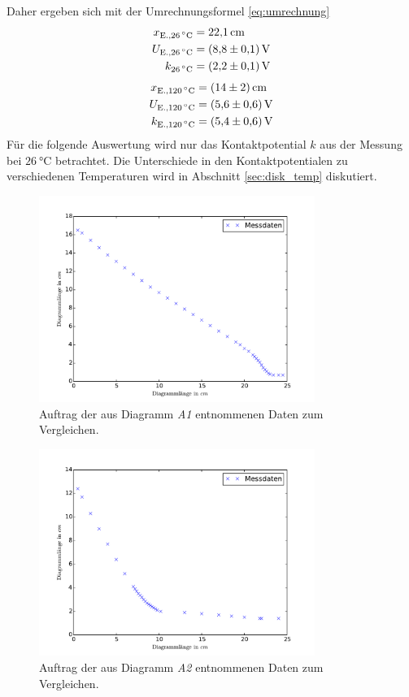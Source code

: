Daher ergeben sich mit der Umrechnungsformel \eqref{eq:umrechnung}
\begin{align}
	x_\text{E.,\SI{26}{\degreeCelsius}}&= \SI{22.1}{\centi\meter}\\
	U_\text{E.,\SI{26}{\degreeCelsius}}&= \SI{8.8(1)}{\volt}\\
	k_\text{\SI{26}{\degreeCelsius}} &= \SI{2.2(1)}{\volt}
	\label{qu:k1}
\end{align}
\begin{align}
	x_\text{E.,\SI{120}{\degreeCelsius}}&= \SI{14(2)}{\centi\meter}\\
	U_\text{E.,\SI{120}{\degreeCelsius}}&= \SI{5.6(6)}{\volt}\\
	k_\text{E.,\SI{120}{\degreeCelsius}}&= \SI{5.4(6)}{\volt}
\end{align}
Für die folgende Auswertung wird nur das Kontaktpotential $k$ aus der Messung bei $\SI{26}{\degreeCelsius}$ betrachtet.
Die Unterschiede in den Kontaktpotentialen zu verschiedenen Temperaturen wird in Abschnitt \ref{sec:disk_temp} diskutiert.
\newpage
\begin{figure}[p!]
	\centering
	\includegraphics[width=0.8\textwidth]{Bilder/Vert_kalt.pdf}
	\caption{Auftrag der aus Diagramm \emph{A1} entnommenen Daten zum Vergleichen.\cite{matplotlib}}
	\label{fig:E_vert_kalt}
\end{figure}
\begin{figure}[p!]
	\centering
	\includegraphics[width=0.8\textwidth]{Bilder/Vert_warm.pdf}
	\caption{Auftrag der aus Diagramm \emph{A2} entnommenen Daten zum Vergleichen.\cite{matplotlib}}
	\label{fig:E_vert_warm}
\end{figure}
